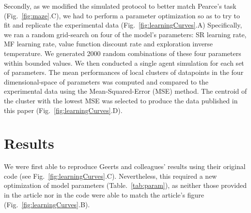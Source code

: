 Secondly, as we modified the simulated protocol to better match Pearce's task (Fig.~\ref{fig:maze}.C), we had to  perform a parameter optimization so as to try to fit and replicate the experimental data (Fig.~\ref{fig:learningCurves}.A) Specifically, we ran a random grid-search on four of the model's parameters: SR learning rate, MF learning rate, value function discount rate and exploration inverse temperature. We generated 2000 random combinations of these four parameters within bounded values. We then conducted a single agent simulation for each set of parameters. The mean performances of local clusters of datapoints in the four dimensional-space of parameters was computed and compared to the experimental data using the Mean-Squared-Error (MSE) method. The centroid of the cluster with the lowest MSE was selected to produce the data published in this paper (Fig.~\ref{fig:learningCurves}.D).

\section{Results}





We were first able to reproduce Geerts and colleagues' results using their original code (see Fig.~\ref{fig:learningCurves}.C). Nevertheless, this required a new optimization of model parameters (Table.~\ref{tab:param}), as neither those provided in the article nor in the code were able to match the article's figure (Fig.~\ref{fig:learningCurves}.B). 

